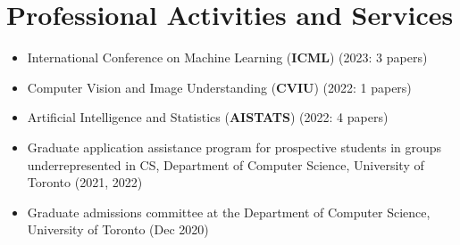 \section*{Professional Activities and Services}
\vspace{\postsubhead}
\begin{adjustwidth}{\indentleft}{\indentright}
  \begin{itemize}
    \item International Conference on Machine Learning (\textbf{ICML}) (2023: 3 papers)
    \item Computer Vision and Image Understanding (\textbf{CVIU}) (2022: 1 papers)
    \item Artificial Intelligence and Statistics (\textbf{AISTATS}) (2022: 4 papers)
    \item Graduate application assistance program for prospective students in groups underrepresented in CS, Department of Computer Science, University of Toronto (2021, 2022)
    \item Graduate admissions committee at the Department of Computer Science, University of Toronto (Dec 2020)
    
  \end{itemize}
\end{adjustwidth}
